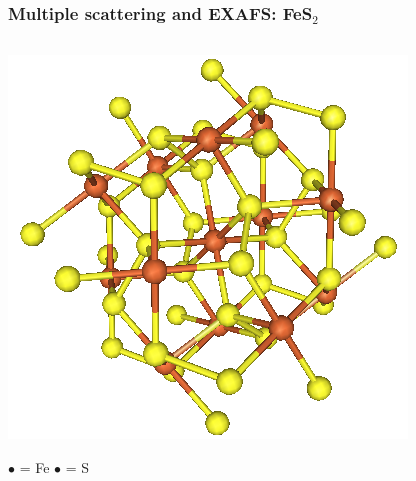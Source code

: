 \documentclass[10pt, xcolor=x11names, compress]{beamer}
\begin{document}
%
%

\begin{frame}
  \frametitle{Multiple scattering and EXAFS: FeS$_2$}
  \begin{columns}
    \begin{column}{0.5\linewidth}
      \includegraphics[width=\linewidth]{images/FeS2/fes2.png}
      \begin{center}
        {\color{Chocolate3}$\bullet$} = Fe \quad%
        {\color{Gold2}$\bullet$} = S
      \end{center}
    \end{column}
    \begin{column}{0.5\linewidth}

\end{column}
\end{columns}
\end{frame}
\end{document}
